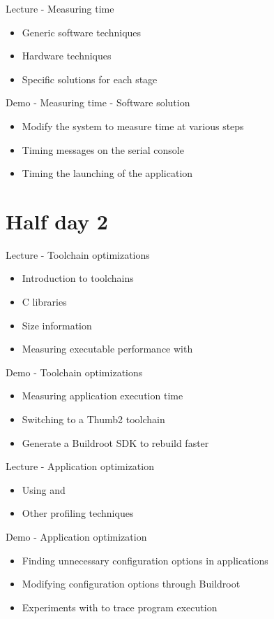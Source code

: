 \documentclass[a4paper,12pt,obeyspaces,spaces,hyphens]{article}
\begin{document}
\feagendatwocolumn
{Lecture - Measuring time}
{
  \begin{itemize}
  \item Generic software techniques
  \item Hardware techniques
  \item Specific solutions for each stage
  \end{itemize}
}
{Demo - Measuring time - Software solution}
{
 \begin{itemize}
 \item Modify the system to measure time at various steps
 \item Timing messages on the serial console
 \item Timing the launching of the application
 \end{itemize}
}

\section{Half day 2}

\feagendaonecolumn
{Lecture - Toolchain optimizations}
{
  \begin{itemize}
  \item Introduction to toolchains
  \item C libraries
  \item Size information
  \item Measuring executable performance with 
  \end{itemize}
}

\feagendaonecolumn
{Demo - Toolchain optimizations}
{
  \begin{itemize}
  \item Measuring application execution time
  \item Switching to a Thumb2 toolchain
  \item Generate a Buildroot SDK to rebuild faster
  \end{itemize}
}

\feagendatwocolumn
{Lecture - Application optimization}
{
  \begin{itemize}
  \item Using  and 
  \item Other profiling techniques
  \end{itemize}
}
{Demo - Application optimization}
{
 \begin{itemize}
 \item Finding unnecessary configuration options in applications
 \item Modifying configuration options through Buildroot
 \item Experiments with  to trace program execution
 \end{itemize}
}
\end{document}
